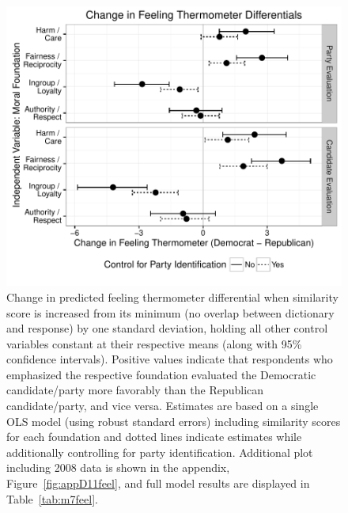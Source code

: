 \documentclass[12pt]{article}
\begin{document}
\begin{figure}[h]\centering
\includegraphics[scale=.9]{../calc/fig/fig7feel.pdf}
\caption{Change in predicted feeling thermometer differential when similarity score is increased from its minimum (no overlap between dictionary and response) by one standard deviation, holding all other control variables constant at their respective means (along with 95\% confidence intervals). Positive values indicate that respondents who emphasized the respective foundation evaluated the Democratic candidate/party more favorably than the Republican candidate/party, and vice versa. Estimates are based on a single OLS model (using robust standard errors) including similarity scores for each foundation and dotted lines indicate estimates while additionally controlling for party identification. Additional plot including 2008 data is shown in the appendix, Figure~\ref{fig:appD11feel}, and full model results are displayed in Table~\ref{tab:m7feel}.}\label{fig:7feel}
\end{figure}
\end{document}
